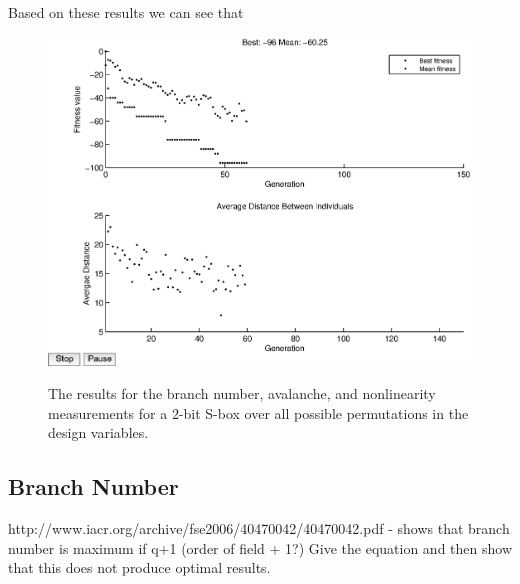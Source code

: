 \documentclass[11pt]{article}
\begin{document}
Based on these results we can see that 

\begin{figure}
\centering
	\includegraphics[scale=0.5]{images/avalanche_results16.eps} \\
	\label{av16}
	\caption{The results for the branch number, avalanche, and nonlinearity measurements for a $2$-bit S-box over all possible permutations in the design variables.}
\end{figure}

\subsection{Branch Number}

http://www.iacr.org/archive/fse2006/40470042/40470042.pdf - shows that branch number is maximum if q+1 (order of field + 1?) Give the equation and then show that this does not produce optimal results.

\cite{MaxBN}
\end{document}
